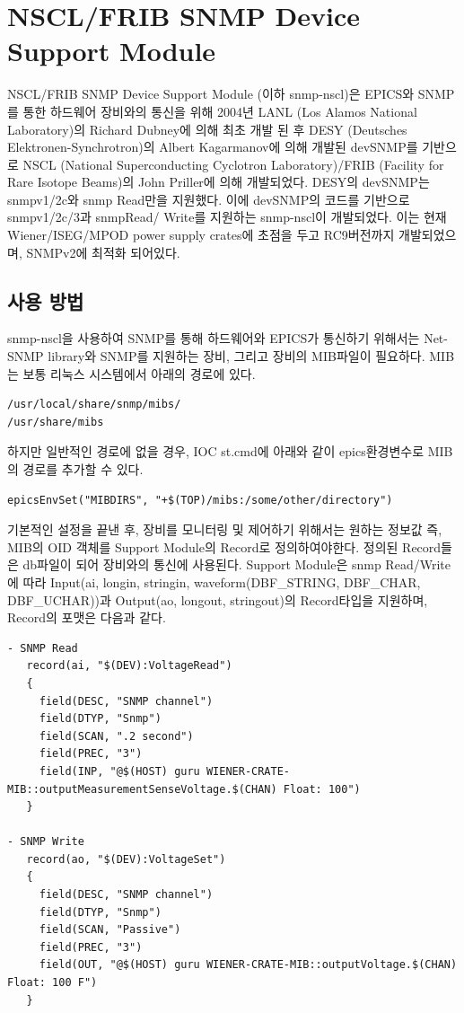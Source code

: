 \documentclass[11pt
  , a4paper
  , article
  , oneside
]{memoir}
\begin{document}
\section{NSCL/FRIB SNMP Device Support Module}
NSCL/FRIB SNMP Device Support Module (이하 snmp-nscl)은 EPICS와 SNMP를 통한 하드웨어 장비와의 통신을 위해 2004년 LANL (Los Alamos National Laboratory)의 Richard Dubney에 의해 최초 개발 된 후 DESY (Deutsches Elektronen-Synchrotron)의 Albert Kagarmanov에 의해 개발된 devSNMP를 기반으로 NSCL (National Superconducting Cyclotron Laboratory)/FRIB (Facility for Rare Isotope Beams)의 John Priller에 의해 개발되었다. DESY의 devSNMP는 snmpv1/2c와 snmp Read만을 지원했다. 이에 devSNMP의 코드를 기반으로 snmpv1/2c/3과 snmpRead/ Write를 지원하는 snmp-nscl이 개발되었다. 이는 현재 Wiener/ISEG/MPOD power supply crates에 초점을 두고 RC9버전까지 개발되었으며, SNMPv2에 최적화 되어있다\citep{devsnmp}. 

\subsection{사용 방법}
snmp-nscl을 사용하여 SNMP를 통해 하드웨어와 EPICS가 통신하기 위해서는 Net-SNMP library와 SNMP를 지원하는 장비, 그리고 장비의 MIB파일이 필요하다. MIB는 보통 리눅스 시스템에서 아래의 경로에 있다.

\begin{lstlisting}[style=termstyle]
/usr/local/share/snmp/mibs/ 
/usr/share/mibs
\end{lstlisting}

하지만 일반적인 경로에 없을 경우, IOC st.cmd에 아래와 같이 epics환경변수로 MIB의 경로를 추가할 수 있다.

\begin{lstlisting}[style=termstyle]
epicsEnvSet("MIBDIRS", "+$(TOP)/mibs:/some/other/directory")
\end{lstlisting}

기본적인 설정을 끝낸 후, 장비를 모니터링 및 제어하기 위해서는 원하는 정보값 즉, MIB의 OID 객체를 Support Module의 Record로 정의하여야한다. 정의된 Record들은 db파일이 되어 장비와의 통신에 사용된다. Support Module은 snmp Read/Write에 따라 Input(ai, longin, stringin, waveform(DBF\_STRING, DBF\_CHAR, DBF\_UCHAR))과 Output(ao, longout, stringout)의 Record타입을 지원하며, Record의 포맷은 다음과 같다. 

\begin{lstlisting}[style=termstyle]
- SNMP Read
   record(ai, "$(DEV):VoltageRead")
   {
     field(DESC, "SNMP channel")
     field(DTYP, "Snmp")
     field(SCAN, ".2 second")
     field(PREC, "3")
     field(INP, "@$(HOST) guru WIENER-CRATE-MIB::outputMeasurementSenseVoltage.$(CHAN) Float: 100")
   }

- SNMP Write
   record(ao, "$(DEV):VoltageSet")
   {
     field(DESC, "SNMP channel")
     field(DTYP, "Snmp")
     field(SCAN, "Passive")
     field(PREC, "3")
     field(OUT, "@$(HOST) guru WIENER-CRATE-MIB::outputVoltage.$(CHAN) Float: 100 F")
   }
\end{lstlisting}
\end{document}
